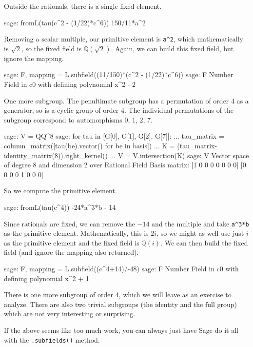 %
Outside the rationals, there is a single fixed element.
%
\begin{sageexample}
sage: fromL(tau(c^2 - (1/22)*c^6))
150/11*a^2
\end{sageexample}
%
Removing a scalar multiple, our primitive element is \verb?a^2?, which mathematically is $\sqrt{2}$, so the fixed field is ${\mathbb Q}(\sqrt{2})$.  Again, we can build this fixed field, but ignore the mapping.
%
\begin{sageexample}
sage: F, mapping = L.subfield((11/150)*(c^2 - (1/22)*c^6))
sage: F
Number Field in c0 with defining polynomial x^2 - 2
\end{sageexample}
%
One more subgroup.  The penultimate subgroup has a permutation of order 4 as a generator, so is a cyclic group of order 4.  The individual permutations of the subgroup correspond to automorphisms 0, 1, 2, 7.
%
\begin{sageexample}
sage: V = QQ^8
sage: for tau in [G[0], G[1], G[2], G[7]]:
...     tau_matrix = column_matrix([tau(be).vector() for be in basis])
...     K = (tau_matrix-identity_matrix(8)).right_kernel()
...     V = V.intersection(K)
sage: V
Vector space of degree 8 and dimension 2 over Rational Field
Basis matrix:
[1 0 0 0 0 0 0 0]
[0 0 0 0 1 0 0 0]
\end{sageexample}
%
So we compute the primitive element.
%
\begin{sageexample}
sage: fromL(tau(c^4))
-24*a^3*b - 14
\end{sageexample}
%
Since rationals are fixed, we can remove the $-14$ and the multiple and take \verb?a^3*b? as the primitive element.  Mathematically, this is $2i$, so we might as well use just $i$ as the primitive element and the fixed field is ${\mathbb Q}(i)$.  We can then build the fixed field (and ignore the mapping also returned).
%
\begin{sageexample}
sage: F, mapping = L.subfield((c^4+14)/-48)
sage: F
Number Field in c0 with defining polynomial x^2 + 1
\end{sageexample}
%
There is one more subgroup of order 4, which we will leave as an exercise to analyze.  There are also two trivial subgroups (the identity and the full group) which are not very interesting or surprising.\par
%
If the above seems like too much work, you can always just have Sage do it all with the \verb?.subfields()? method.
%
